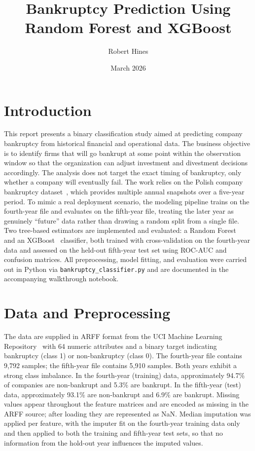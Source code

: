 \documentclass[11pt]{article}
\title{Bankruptcy Prediction Using Random Forest and XGBoost}
\author{Robert Hines}
\date{March 2026}
\begin{document}
\maketitle

\section{Introduction}

This report presents a binary classification study aimed at predicting company bankruptcy from historical financial and operational data. The business objective is to identify firms that will go bankrupt at some point within the observation window so that the organization can adjust investment and divestment decisions accordingly. The analysis does not target the exact timing of bankruptcy, only whether a company will eventually fail. The work relies on the Polish company bankruptcy dataset~\cite{uci,zieba2016}, which provides multiple annual snapshots over a five-year period. To mimic a real deployment scenario, the modeling pipeline trains on the fourth-year file and evaluates on the fifth-year file, treating the later year as genuinely ``future'' data rather than drawing a random split from a single file. Two tree-based estimators are implemented and evaluated: a Random Forest~\cite{breiman2001} and an XGBoost~\cite{chen2016} classifier, both trained with cross-validation on the fourth-year data and assessed on the held-out fifth-year test set using ROC-AUC and confusion matrices. All preprocessing, model fitting, and evaluation were carried out in Python via \texttt{bankruptcy\_classifier.py} and are documented in the accompanying walkthrough notebook.

\section{Data and Preprocessing}

The data are supplied in ARFF format from the UCI Machine Learning Repository~\cite{uci} with 64 numeric attributes and a binary target indicating bankruptcy (class 1) or non-bankruptcy (class 0). The fourth-year file contains 9,792 samples; the fifth-year file contains 5,910 samples. Both years exhibit a strong class imbalance. In the fourth-year (training) data, approximately 94.7\% of companies are non-bankrupt and 5.3\% are bankrupt. In the fifth-year (test) data, approximately 93.1\% are non-bankrupt and 6.9\% are bankrupt. Missing values appear throughout the feature matrices and are encoded as missing in the ARFF source; after loading they are represented as NaN. Median imputation was applied per feature, with the imputer fit on the fourth-year training data only and then applied to both the training and fifth-year test sets, so that no information from the hold-out year influences the imputed values.
\end{document}
